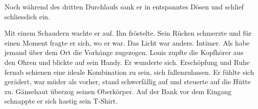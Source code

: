 
Noch während des dritten Durchlaufs sank er in entspanntes Dösen und
schlief schliesslich ein.

\sectionbreak

Mit einem Schaudern wachte er auf. Ihn fröstelte. Sein Rücken schmerzte
und für einen Moment fragte er sich, wo er war.
Das Licht war anders. Intimer. Als habe jemand über dem Ort die Vorhänge zugezogen. 
Louis zupfte die Kopfhörer aus den Ohren und blickte auf sein Handy. Er
wunderte sich. Erschöpfung und Ruhe fernab schienen eine ideale
Kombination zu sein, sich fallenzulassen.
Er fühlte sich gerädert, war müder als vorher, stand schwerfällig auf
und steuerte auf die Hütte zu. Gänsehaut überzog seinen Oberkörper. Auf
der Bank vor dem Eingang schnappte er sich hastig sein T-Shirt. 
